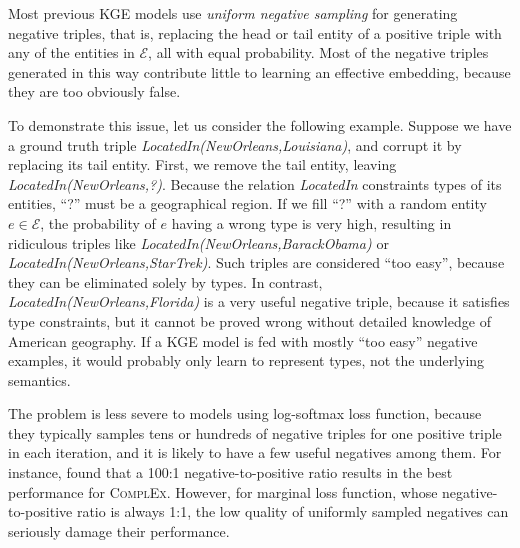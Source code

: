 \documentclass[11pt,a4paper]{article}
\begin{document}
Most previous KGE models use \emph{uniform negative sampling} for generating negative triples, that is, replacing the head or tail entity of a positive triple with any of the entities in $\mathcal{E}$, all with equal probability. Most of the negative triples generated in this way contribute little to learning an effective embedding, because they are too obviously false.

To demonstrate this issue, let us consider the following example. Suppose we have a ground truth triple \emph{LocatedIn(NewOrleans,Louisiana)}, and corrupt it by replacing its tail entity. First, we remove the tail entity, leaving \emph{LocatedIn(NewOrleans,?)}. 
Because the relation \emph{LocatedIn} constraints types of its entities, ``?'' must be a geographical region. If we fill ``?'' with a random entity $e\in\mathcal{E}$, the probability of $e$ having a wrong type is very high, resulting in ridiculous triples like \emph{LocatedIn(NewOrleans,BarackObama)} or \emph{LocatedIn(NewOrleans,StarTrek)}. Such triples are considered ``too easy'', because they can be eliminated solely by types. In contrast, \emph{LocatedIn(NewOrleans,Florida)} is a very useful negative triple, because it satisfies type constraints, but it cannot be proved wrong without detailed knowledge of American geography. If a KGE model is fed with mostly ``too easy'' negative examples, it would probably only learn to represent types, not the underlying semantics.

The problem is less severe to models using log-softmax loss function, because they typically samples tens or hundreds of negative triples for one positive triple in each iteration, and it is likely to have a few useful negatives among them. For instance, \cite{trouillon2016complex} found that a 100:1 negative-to-positive ratio results in the best performance for \textsc{ComplEx}. However, for marginal loss function, whose negative-to-positive ratio is always 1:1, the low quality of uniformly sampled negatives can seriously damage their performance.
\end{document}
